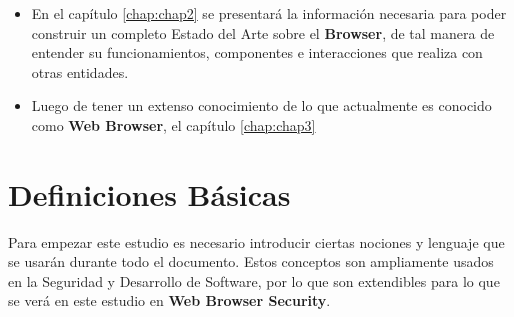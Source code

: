 \begin{itemize}
	\item En el capítulo \ref{chap:chap2} se presentará la información necesaria para poder construir un completo Estado del Arte sobre el \textbf{Browser}, de tal manera de entender su funcionamientos, componentes e interacciones que realiza con otras entidades. 
	\item Luego de tener un extenso conocimiento de lo que actualmente es conocido como \textbf{Web Browser}, el capítulo \ref{chap:chap3}
\end{itemize}




\section{Definiciones Básicas}
\label{chap:Def}

Para empezar este estudio es necesario introducir ciertas nociones y lenguaje que se usarán durante todo el documento. Estos conceptos son ampliamente usados en la Seguridad y Desarrollo de Software, por lo que son extendibles para lo que se verá en este estudio en \textbf{Web Browser Security}.

